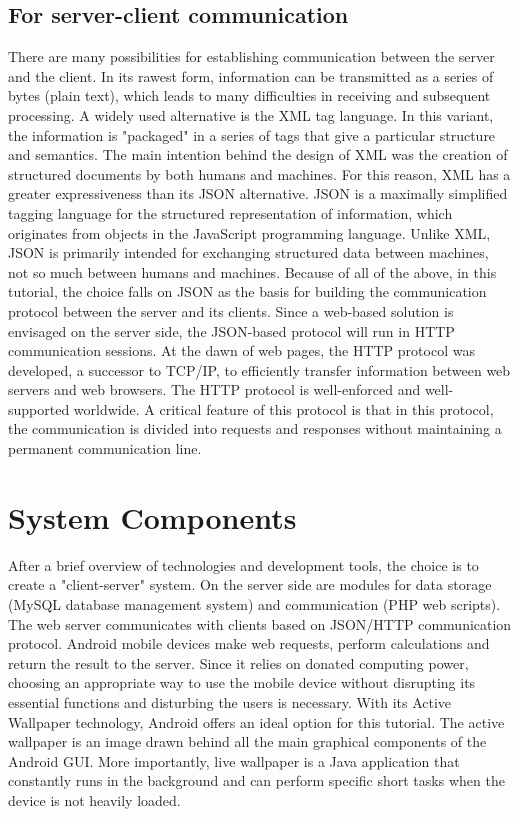 \subsection{For server-client communication}

There are many possibilities for establishing communication between the server and the client. In its rawest form, information can be transmitted as a series of bytes (plain text), which leads to many difficulties in receiving and subsequent processing. A widely used alternative is the XML tag language. In this variant, the information is "packaged" in a series of tags that give a particular structure and semantics. The main intention behind the design of XML was the creation of structured documents by both humans and machines. For this reason, XML has a greater expressiveness than its JSON alternative. JSON is a maximally simplified tagging language for the structured representation of information, which originates from objects in the JavaScript programming language. Unlike XML, JSON is primarily intended for exchanging structured data between machines, not so much between humans and machines. Because of all of the above, in this tutorial, the choice falls on JSON as the basis for building the communication protocol between the server and its clients. Since a web-based solution is envisaged on the server side, the JSON-based protocol will run in HTTP communication sessions. At the dawn of web pages, the HTTP protocol was developed, a successor to TCP/IP, to efficiently transfer information between web servers and web browsers. The HTTP protocol is well-enforced and well-supported worldwide. A critical feature of this protocol is that in this protocol, the communication is divided into requests and responses without maintaining a permanent communication line.

\section{System Components}

After a brief overview of technologies and development tools, the choice is to create a "client-server" system. On the server side are modules for data storage (MySQL database management system) and communication (PHP web scripts). The web server communicates with clients based on JSON/HTTP communication protocol. Android mobile devices make web requests, perform calculations and return the result to the server. Since it relies on donated computing power, choosing an appropriate way to use the mobile device without disrupting its essential functions and disturbing the users is necessary. With its Active Wallpaper technology, Android offers an ideal option for this tutorial. The active wallpaper is an image drawn behind all the main graphical components of the Android GUI. More importantly, live wallpaper is a Java application that constantly runs in the background and can perform specific short tasks when the device is not heavily loaded.

